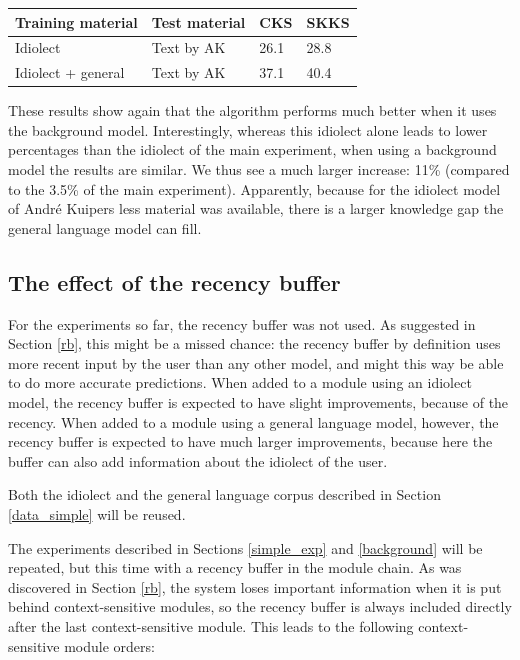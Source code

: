 \documentclass[11pt]{article}
\let\originaltable\table
\let\endoriginaltable\endtable
\renewenvironment{table}[1][ht]{%
  \originaltable[#1]
  \centering}%
  {\endoriginaltable}
\begin{document}
\begin{table}[H]
\begin{tabular}{ll|ll} 
Training material&Test material&CKS&SKKS\\
\hline
Idiolect&Text by AK&26.1&28.8\\
Idiolect + general&Text by AK&37.1&40.4\\
\end{tabular} 
\caption{Percentage of keystrokes that can be saved when using the idiolect of Andr\'e Kuipers, with and without background model} \label{results_kuipers}
\end{table}

These results show again that the algorithm performs much better when it uses the background model. Interestingly, whereas this idiolect alone leads to lower percentages than the idiolect of the main experiment, when using a background model the results are similar. We thus see a much larger increase: 11\% (compared to the 3.5\% of the main experiment). Apparently, because for the idiolect model of Andr\'e Kuipers less material was available, there is a larger knowledge gap the general language model can fill.


\subsection{The effect of the recency buffer} \label{recbuf}

For the experiments so far, the recency buffer was not used. As suggested in Section \ref{rb}, this might be a missed chance: the recency buffer by definition uses more recent input by the user than any other model, and might this way be able to do more accurate predictions. When added to a module using an idiolect model, the recency buffer is expected to have slight improvements, because of the recency. When added to a module using a general language model, however, the recency buffer is expected to have much larger improvements, because here the buffer can also add information about the idiolect of the user.

Both the idiolect and the general language corpus described in Section \ref{data_simple} will be reused. 

The experiments described in Sections \ref{simple_exp} and \ref{background} will be repeated, but this time with a recency buffer in the module chain. As was discovered in Section \ref{rb}, the system loses important information when it is put behind context-sensitive modules, so the recency buffer is always included directly after the last context-sensitive module. This leads to the following context-sensitive module orders:
\end{document}
